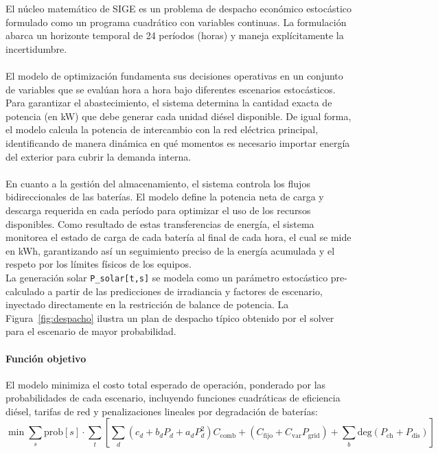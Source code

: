 \documentclass[journal,article,submit,pdftex,moreauthors]{Definitions/mdpi}
\begin{document}
El n\'ucleo matem\'atico de SIGE es un problema de despacho econ\'omico estoc\'astico formulado como un programa cuadr\'atico con variables continuas. La formulaci\'on abarca un horizonte temporal de 24 per\'iodos (horas) y maneja expl\'icitamente la incertidumbre.
\\\\
El modelo de optimizaci\'on fundamenta sus decisiones operativas en un conjunto de variables que se eval\'uan hora a hora bajo diferentes escenarios estoc\'asticos. Para garantizar el abastecimiento, el sistema determina la cantidad exacta de potencia (en kW) que debe generar cada unidad di\'esel disponible. De igual forma, el modelo calcula la potencia de intercambio con la red el\'ectrica principal, identificando de manera din\'amica en qu\'e momentos es necesario importar energ\'ia del exterior para cubrir la demanda interna.
\\\\
En cuanto a la gesti\'on del almacenamiento, el sistema controla los flujos bidireccionales de las bater\'ias. El modelo define la potencia neta de carga y descarga requerida en cada per\'iodo para optimizar el uso de los recursos disponibles. Como resultado de estas transferencias de energ\'ia, el sistema monitorea el estado de carga de cada bater\'ia al final de cada hora, el cual se mide en kWh, garantizando as\'i un seguimiento preciso de la energ\'ia acumulada y el respeto por los l\'imites f\'isicos de los equipos.
\\

La generaci\'on solar \texttt{P\_solar[t,s]} se modela como un par\'ametro estoc\'astico pre-calculado a partir de las predicciones de irradiancia y factores de escenario, inyectado directamente en la restricci\'on de balance de potencia. La Figura~\ref{fig:despacho} ilustra un plan de despacho t\'ipico obtenido por el solver para el escenario de mayor probabilidad.

\paragraph{Funci\'on objetivo}
El modelo minimiza el costo total esperado de operaci\'on, ponderado por las probabilidades de cada escenario, incluyendo funciones cuadr\'aticas de eficiencia di\'esel, tarifas de red y penalizaciones lineales por degradaci\'on de bater\'ias:
\begin{equation}
\min \sum_{s} \text{prob}[s] \cdot \sum_{t} \left[ \sum_{d} (c_d + b_d P_d + a_d P_d^2) C_{\text{comb}} + (C_{\text{fijo}} + C_{\text{var}} P_{\text{grid}}) + \sum_{b} \text{deg} (P_{\text{ch}} + P_{\text{dis}}) \right]
\end{equation}
\end{document}
